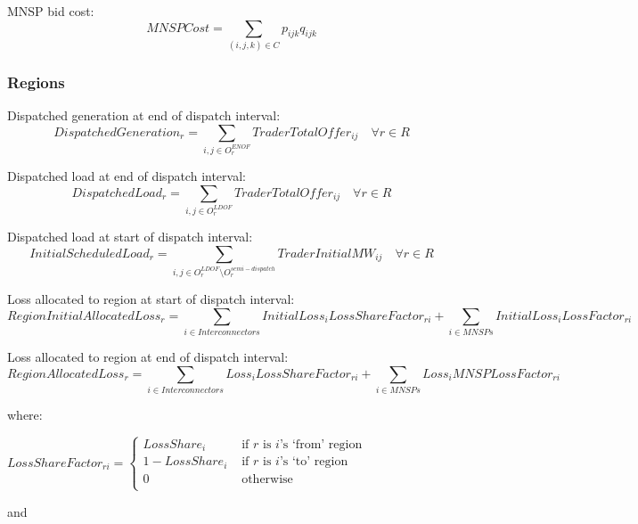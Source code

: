 \documentclass{article}
\begin{document}
MNSP bid cost:
\begin{equation}
MNSPCost =\sum\limits_{(i,j,k) \in C} p_{ijk} q_{ijk}
\end{equation}

\subsubsection{Regions}
Dispatched generation at end of dispatch interval:
\begin{equation}
	DispatchedGeneration_{r} = \sum\limits_{i,j \in O^{ENOF}_{r}} TraderTotalOffer_{ij} \quad\forall r \in R
\end{equation}

Dispatched load at end of dispatch interval:
\begin{equation}
DispatchedLoad_{r} = \sum\limits_{i,j \in O^{LDOF}_{r}} TraderTotalOffer_{ij} \quad\forall r \in R
\end{equation}


Dispatched load at start of dispatch interval:
\begin{equation}
InitialScheduledLoad_{r} = \sum\limits_{i,j \in O^{LDOF}_{r} \setminus O^{semi-dispatch}_{r}} TraderInitialMW_{ij} \quad\forall r \in R
\end{equation}

Loss allocated to region at start of dispatch interval:
\begin{equation}
	RegionInitialAllocatedLoss_{r} = \sum\limits_{i \in Interconnectors} InitialLoss_{i} LossShareFactor_{ri} + \sum\limits_{i \in MNSPs} InitialLoss_{i} LossFactor_{ri}
\end{equation}

Loss allocated to region at end of dispatch interval:
\begin{equation}
RegionAllocatedLoss_{r} = \sum\limits_{i \in Interconnectors} Loss_{i} LossShareFactor_{ri} + \sum\limits_{i \in MNSPs} Loss_{i} MNSPLossFactor_{ri}
\end{equation}

where:

$LossShareFactor_{ri}=
\begin{cases}
LossShare_{i} &\textrm{ if $r$ is $i$'s `from' region} \\
1 - LossShare_{i} &\textrm{ if $r$ is $i$'s `to' region} \\
0 &\textrm{ otherwise} \\
\end{cases}$

and 
\end{document}
